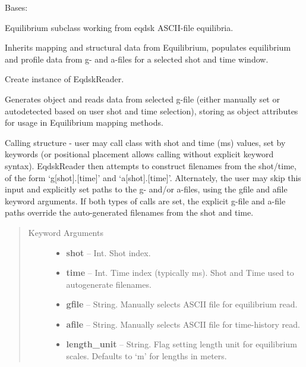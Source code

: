 \documentclass[letterpaper,10pt,english]{sphinxmanual}
\begin{document}
\begin{fulllineitems}
\label{eqtools:eqtools.eqdskreader.EqdskReader}
Bases: {\hyperref[eqtools:eqtools.core.Equilibrium]{}}

Equilibrium subclass working from eqdsk ASCII-file equilibria.

Inherits mapping and structural data from Equilibrium, populates equilibrium
and profile data from g- and a-files for a selected shot and time window.

Create instance of EqdskReader.

Generates object and reads data from selected g-file (either manually set or
autodetected based on user shot and time selection), storing as object
attributes for usage in Equilibrium mapping methods.

Calling structure - user may call class with shot and time (ms) values, set by keywords
(or positional placement allows calling without explicit keyword syntax).  EqdskReader
then attempts to construct filenames from the shot/time, of the form `g{[}shot{]}.{[}time{]}' and
`a{[}shot{]}.{[}time{]}'.  Alternately, the user may skip this input and explicitly set paths to
the g- and/or a-files, using the gfile and afile keyword arguments.  If both types of calls
are set, the explicit g-file and a-file paths override the auto-generated filenames from
the shot and time.
\begin{quote}\begin{description}
\item[{Keyword Arguments}] \leavevmode\begin{itemize}
\item {} 
\textbf{shot} --
Int.  Shot index.

\item {} 
\textbf{time} --
Int.  Time index (typically ms).  Shot and Time used to autogenerate filenames.

\item {} 
\textbf{gfile} --
String.  Manually selects ASCII file for equilibrium read.

\item {} 
\textbf{afile} --
String.  Manually selects ASCII file for time-history read.

\item {} 
\textbf{length\_unit} --
String.  Flag setting length unit for equilibrium scales.
Defaults to `m' for lengths in meters.


\end{itemize}
\end{description}
\end{quote}
\end{fulllineitems}
\end{document}
